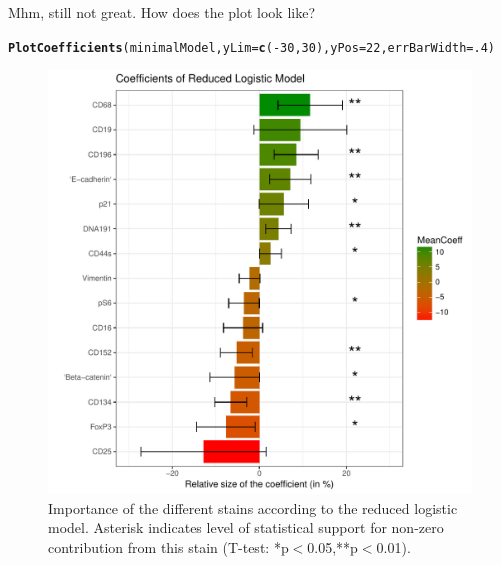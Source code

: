 \documentclass[a4paper]{article}\usepackage[]{graphicx}\usepackage[]{color}
\makeatletter
\def\maxwidth{ %
  \ifdim\Gin@nat@width>\linewidth
    \linewidth
  \else
    \Gin@nat@width
  \fi
}
\newcommand{\hlnum}[1]{\textcolor[rgb]{0.686,0.059,0.569}{#1}}%
\newcommand{\hlopt}[1]{\textcolor[rgb]{0,0,0}{#1}}%
\newcommand{\hlstd}[1]{\textcolor[rgb]{0.345,0.345,0.345}{#1}}%
\newcommand{\hlkwc}[1]{\textcolor[rgb]{0.333,0.667,0.333}{#1}}%
\newcommand{\hlkwd}[1]{\textcolor[rgb]{0.737,0.353,0.396}{\textbf{#1}}}%
\newenvironment{kframe}{%
 \def\at@end@of@kframe{}%
 \ifinner\ifhmode%
  \def\at@end@of@kframe{\end{minipage}}%
  \begin{minipage}{\columnwidth}%
 \fi\fi%
 \def\FrameCommand##1{\hskip\@totalleftmargin \hskip-\fboxsep
 \colorbox{shadecolor}{##1}\hskip-\fboxsep
     \hskip-\linewidth \hskip-\@totalleftmargin \hskip\columnwidth}%
 \MakeFramed {\advance\hsize-\width
   \@totalleftmargin\z@ \linewidth\hsize
   \@setminipage}}%
 {\par\unskip\endMakeFramed%
 \at@end@of@kframe}
\newenvironment{knitrout}{}{} %
\makeatother
\begin{document}
Mhm, still not great. How does the plot look like?
\begin{knitrout}
\color{fgcolor}\begin{kframe}
\begin{alltt}
\hlkwd{PlotCoefficients}\hlstd{(minimalModel,}\hlkwc{yLim}\hlstd{=}\hlkwd{c}\hlstd{(}\hlopt{-}\hlnum{30}\hlstd{,}\hlnum{30}\hlstd{),}\hlkwc{yPos}\hlstd{=}\hlnum{22}\hlstd{,}\hlkwc{errBarWidth}\hlstd{=}\hlnum{.4}\hlstd{)}
\end{alltt}
\end{kframe}\begin{figure}[h]
\includegraphics[width=\maxwidth]{figure/Fig_minModCoeff-1} \caption[Importance of the different stains according to the reduced logistic model]{Importance of the different stains according to the reduced logistic model. Asterisk indicates level of statistical support for non-zero contribution from this stain (T-test: *p$<$0.05,**p$<$0.01).}\label{fig:Fig_minModCoeff}
\end{figure}


\end{knitrout}
\end{document}
